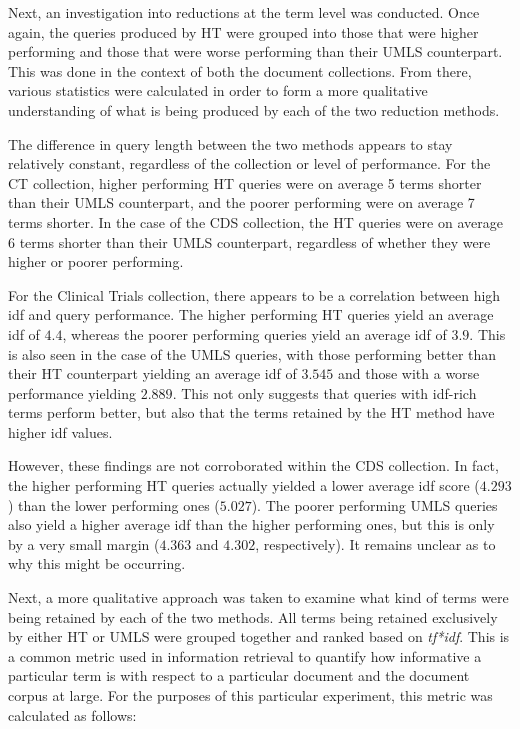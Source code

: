 \documentclass[a4paper]{report}
\begin{document}
Next, an investigation into reductions at the term level was conducted. Once again, the queries produced by HT were grouped into those that were higher performing and those that were worse performing than their UMLS counterpart. This was done in the context of both the document collections. From there, various statistics were calculated in order to form a more qualitative understanding of what is being produced by each of the two reduction methods.

The difference in query length between the two methods appears to stay relatively constant, regardless of the collection or level of performance. For the CT collection, higher performing HT queries were on average 5 terms shorter than their UMLS counterpart, and the poorer performing were on average 7 terms shorter. In the case of the CDS collection, the HT queries were on average 6 terms shorter than their UMLS counterpart, regardless of whether they were higher or poorer performing.

For the Clinical Trials collection, there appears to be a correlation between high idf and query performance. The higher performing HT queries yield an average idf of $4.4$, whereas the poorer performing queries yield an average idf of $3.9$. This is also seen in the case of the UMLS queries, with those performing better than their HT counterpart yielding an average idf of $3.545$ and those with a worse performance yielding $2.889$. This not only suggests that queries with idf-rich terms perform better, but also that the terms retained by the HT method have higher idf values.

However, these findings are not corroborated within the CDS collection. In fact, the higher performing HT queries actually yielded a lower average idf score ($4.293$) than the lower performing ones ($5.027$). The poorer performing UMLS queries also yield a higher average idf than the higher performing ones, but this is only by a very small margin ($4.363$ and $4.302$, respectively). It remains unclear as to why this might be occurring.

Next, a more qualitative approach was taken to examine what kind of terms were being retained by each of the two methods. All terms being retained exclusively by either HT or UMLS were grouped together and ranked based on \textit{tf*idf}. This is a common metric used in information retrieval to quantify how informative a particular term is with respect to a particular document and the document corpus at large. For the purposes of this particular experiment, this metric was calculated as follows:
\end{document}
